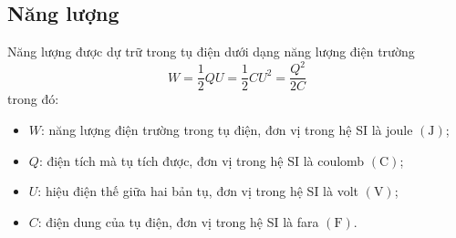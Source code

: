 \subsection{Năng lượng}
Năng lượng được dự trữ trong tụ điện dưới dạng năng lượng điện trường
$$W=\dfrac{1}{2}QU=\dfrac{1}{2}CU^2=\dfrac{Q^2}{2C}$$
trong đó:
\begin{itemize}
	\item $W$: năng lượng điện trường trong tụ điện, đơn vị trong hệ SI là joule $\left(\si{\joule}\right)$;
	\item $Q$: điện tích mà tụ tích được, đơn vị trong hệ SI là coulomb $\left(\si{\coulomb}\right)$;
	\item $U$: hiệu điện thế giữa hai bản tụ, đơn vị trong hệ SI là volt $\left(\si{\volt}\right)$;
	\item $C$: điện dung của tụ điện, đơn vị trong hệ SI là fara $\left(\si{\farad}\right)$.
\end{itemize}
